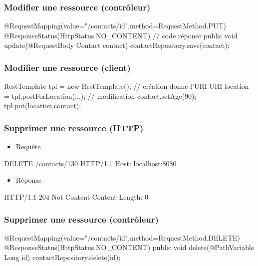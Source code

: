 \begin{frame}[fragile]
 \frametitle{Modifier une ressource (contrôleur)}

 \begin{javacode}
@RequestMapping(value="/contacts/{id}",method=RequestMethod.PUT)
@ResponseStatus(HttpStatus.NO_CONTENT)  // code r\'eponse
public void update(@RequestBody Contact contact) {
  contactRepository.save(contact);
}
 \end{javacode}

\end{frame}

\begin{frame}[fragile]
 \frametitle{Modifier une ressource (client)}

 \begin{javacode}
RestTemplate tpl = new RestTemplate();
// cr\'eation donne l'URI
URI location = tpl.postForLocation(...);
// modification
contact.setAge(90);
tpl.put(location,contact);
 \end{javacode}

\end{frame}

\begin{frame}[fragile]
 \frametitle{Supprimer une ressource (HTTP)}

 \begin{itemize}
  \item Requête
 \end{itemize}

 \begin{textcode}
DELETE /contacts/130 HTTP/1.1
Host: localhost:8080
 \end{textcode}

  \begin{itemize}
  \item Réponse
 \end{itemize}

 \begin{textcode}
HTTP/1.1 204 Not Content
Content-Length: 0
 \end{textcode}

\end{frame}

\begin{frame}[fragile]
 \frametitle{Supprimer une ressource (contrôleur)}

 \begin{javacode}
@RequestMapping(value="/contacts/{id}",method=RequestMethod.DELETE)
@ResponseStatus(HttpStatus.NO_CONTENT)
public void delete(@PathVariable Long id) {
  contactRepository.delete(id);
}
 \end{javacode}

\end{frame}

